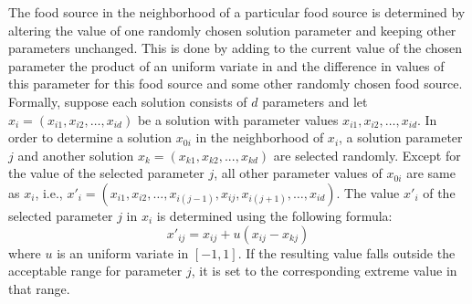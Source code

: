 \documentclass[pdftex,11pt]{article}
\begin{document}
The food source in the neighborhood of a particular food source is determined by altering the value of one randomly chosen solution parameter and keeping other parameters unchanged. This is done by adding to the current value of the chosen parameter the product of an uniform variate in and the difference in values of this parameter for this food source and some other randomly chosen food source. Formally, suppose each solution consists of $d$ parameters and let $x_i = (x_{i1}, x_{i2}, \dots, x_{id})$ be a solution with parameter values $x_{i1}, x_{i2}, \dots, x_{id}$. In order to determine a solution $x_{0i}$ in the neighborhood of $x_i$, a solution parameter $j$ and another solution $x_k = (x_{k1}, x_{k2}, . . ., x_{kd})$ are selected randomly. Except for the value of the selected parameter $j$, all other parameter values of $x_{0i}$ are same as $x_i$, i.e., $x'_i = (x_{i1},x_{i2}, \dots, x_{i(j-1)}, x_{ij}, x_{i(j+1)}, \dots, x_{id})$. The value $x'_i$ of the selected parameter $j$ in $x_i$ is determined using the following formula:
\begin{equation}
x'_{ij} = x_{ij} + u(x_{ij} - x_{kj})
\end{equation}
where $u$ is an uniform variate in $[-1,1]$. If the resulting value falls outside the acceptable range for parameter $j$, it is set to the corresponding extreme value in that range.
\end{document}
